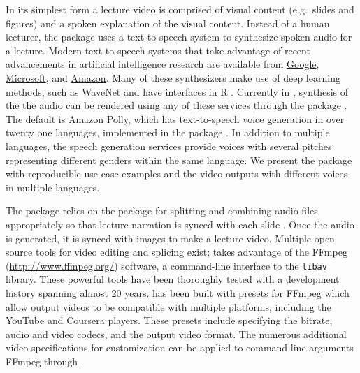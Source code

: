 In its simplest form a lecture video is comprised of visual content
(e.g.~slides and figures) and a spoken explanation of the visual
content. Instead of a human lecturer, the  package uses a
text-to-speech system to synthesize spoken audio for a lecture. Modern
text-to-speech systems that take advantage of recent advancements in
artificial intelligence research are available from
\href{https://cloud.google.com/text-to-speech/}{Google},
\href{https://azure.microsoft.com/en-us/services/cognitive-services/text-to-speech/}{Microsoft},
and \href{https://aws.amazon.com/polly/}{Amazon}. Many of these
synthesizers make use of deep learning methods, such as WaveNet
\citep{van2016wavenet} and have interfaces in R
\citep{googleLanguageR, mscstts, aws.polly}. Currently in ,
synthesis of the the audio can be rendered using any of these services
through the  package \citep{text2speech}. The
default is \href{https://aws.amazon.com/polly/}{Amazon Polly}, which has
text-to-speech voice generation in over twenty one languages,
implemented in the  package \citep{aws.polly}. In
addition to multiple languages, the speech generation services provide
voices with several pitches representing different genders within the
same language. We present the  package with reproducible use
case examples and the video outputs with different voices in multiple
languages.

The  package relies on the  package for
splitting and combining audio files appropriately so that lecture
narration is synced with each slide \citep{tuneR}. Once the audio is
generated, it is synced with images to make a lecture video. Multiple
open source tools for video editing and splicing exist;  takes
advantage of the FFmpeg (\url{http://www.ffmpeg.org/}) software, a
command-line interface to the \texttt{libav} library. These powerful
tools have been thoroughly tested with a development history spanning
almost 20 years.  has been built with presets for FFmpeg which
allow output videos to be compatible with multiple platforms, including
the YouTube and Coursera players. These presets include specifying the
bitrate, audio and video codecs, and the output video format. The
numerous additional video specifications for customization can be
applied to command-line arguments FFmpeg through .

